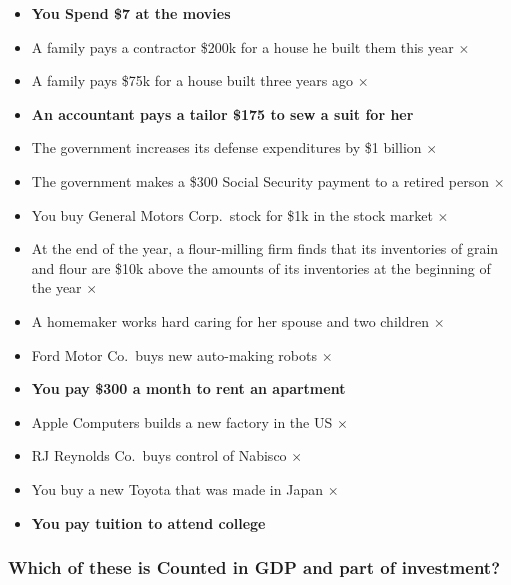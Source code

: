 \documentclass[
  letterpaper,
  DIV=11,
  numbers=noendperiod]{scrartcl}
\providecommand{\tightlist}{%
  \setlength{\itemsep}{0pt}\setlength{\parskip}{0pt}}\usepackage{longtable,booktabs,array}
\begin{document}
\begin{itemize}
\tightlist
\item
  \textbf{You Spend \$7 at the movies}
\item
  A family pays a contractor \$200k for a house he built them this year
  \(\times\)
\item
  A family pays \$75k for a house built three years ago \(\times\)
\item
  \textbf{An accountant pays a tailor \$175 to sew a suit for her}
\item
  The government increases its defense expenditures by \$1 billion
  \(\times\)
\item
  The government makes a \$300 Social Security payment to a retired
  person \(\times\)
\item
  You buy General Motors Corp.~stock for \$1k in the stock market
  \(\times\)
\item
  At the end of the year, a flour-milling firm finds that its
  inventories of grain and flour are \$10k above the amounts of its
  inventories at the beginning of the year \(\times\)
\item
  A homemaker works hard caring for her spouse and two children
  \(\times\)
\item
  Ford Motor Co.~buys new auto-making robots \(\times\)
\item
  \textbf{You pay \$300 a month to rent an apartment}
\item
  Apple Computers builds a new factory in the US \(\times\)
\item
  RJ Reynolds Co.~buys control of Nabisco \(\times\)
\item
  You buy a new Toyota that was made in Japan \(\times\)
\item
  \textbf{You pay tuition to attend college}
\end{itemize}

\subsubsection{Which of these is Counted in GDP and part of
investment?}\label{which-of-these-is-counted-in-gdp-and-part-of-investment}
\end{document}
